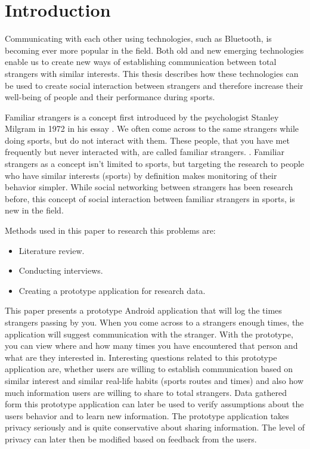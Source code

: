 
\section{Introduction}

Communicating with each other using technologies, such as Bluetooth, is becoming ever more popular in the field. Both old and new emerging technologies enable us to create new ways of establishing communication between total strangers with similar interests. This thesis describes how these technologies can be used to create social interaction between strangers and therefore increase their well-being of people and their performance during sports.

Familiar strangers is a concept first introduced by the psychologist Stanley Milgram in 1972 in his essay \citep{milgram1992}. We often come across to the same strangers while doing sports, but do not interact with them. These people, that you have met frequently but never interacted with, are called familiar strangers. \citep{familiarStranger}. Familiar strangers as a concept isn't limited to sports, but targeting the research to people who have similar interests (sports) by definition makes monitoring of their behavior simpler. While social networking between strangers has been research before, this concept of social interaction between familiar strangers in sports, is new in the field.

Methods used in this paper to research this problems are:
\begin{itemize}
\item  Literature review.
\item Conducting interviews.
\item Creating a prototype application for research data.
\end{itemize}

This paper presents a prototype Android application that will log the times strangers passing by you. When you come across to a strangers enough times, the application will suggest communication with the stranger. With the prototype, you can view where and how many times you have encountered that person and what are they interested in. Interesting questions related to this prototype application are, whether users are willing to establish communication based on similar interest and similar real-life habits (sports routes and times) and also how much information users are willing to share to total strangers. Data gathered form this prototype application can later be used to verify assumptions about the users behavior and to learn new information. The prototype application takes privacy seriously and is quite conservative about sharing information. The level of privacy can later then be modified based on feedback from the users.


